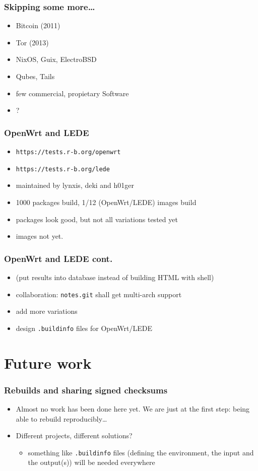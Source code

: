 \documentclass[14pt,aspectratio=169]{beamer}
\newif\ifplacelogo
\begin{document}
\begin{frame}
 \frametitle{Skipping some more…}
 \begin{itemize}
\item Bitcoin (2011)
\item Tor (2013)
\item NixOS, Guix, ElectroBSD
\item Qubes, Tails
\item few commercial, propietary Software
\item ?
 \end{itemize}
\end{frame}


\begin{frame}
 \frametitle{OpenWrt and LEDE}
 \begin{itemize}
  \item \texttt{https://tests.r-b.org/openwrt}
  \item \texttt{https://tests.r-b.org/lede}
  \item maintained by lynxis, deki and h01ger
  \item 1000 packages build, 1/12 (OpenWrt/LEDE) images build
  \item packages look good, but not all variations tested yet
  \item images not yet.
 \end{itemize}
\end{frame}

\begin{frame}
 \frametitle{OpenWrt and LEDE cont.}
 \begin{itemize}
  \item (put results into database instead of building HTML with shell)
  \item collaboration: \texttt{notes.git} shall get multi-arch support
  \item add more variations
  \item design \texttt{.buildinfo} files for OpenWrt/LEDE
 \end{itemize}
\end{frame}


\placelogotrue

\section{Future work}

\begin{frame}
 \frametitle{Rebuilds and sharing signed checksums}
 \begin{itemize}
  \item Almost no work has been done here yet. We are just at the first step:
  being able to rebuild reproducibly…
  \item Different projects, different solutions?
 \begin{itemize}
  \item<2> something like \texttt{.buildinfo} files (defining the environment,
  the input and the output(s)) will be needed everywhere
 \end{itemize}
 \end{itemize}
\end{frame}
\end{document}

